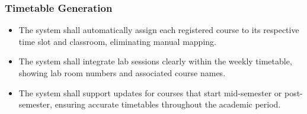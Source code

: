 \documentclass[a4paper,12pt]{article}
\begin{document}







\subsubsection{Timetable Generation}
\begin{itemize}
\item The system shall automatically assign each registered course to its respective time slot and classroom, eliminating manual mapping.

\item The system shall integrate lab sessions clearly within the weekly timetable, showing lab room numbers and associated course names.

\item The system shall support updates for courses that start mid-semester or post-semester, ensuring accurate timetables throughout the academic period.
\end{itemize}
\end{document}
